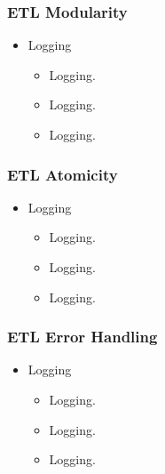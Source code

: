 
\begin{frame}
    \frametitle{ETL Modularity}
    \begin{itemize}[<+->]
        \item Logging
        \begin{itemize}[<+->]
            \item  Logging.
            \item  Logging.
            \item  Logging.


        \end{itemize}
    \end{itemize}
\end{frame}


\begin{frame}
    \frametitle{ETL Atomicity}
    \begin{itemize}[<+->]
        \item Logging
        \begin{itemize}[<+->]
            \item  Logging.
            \item  Logging.
            \item  Logging.


        \end{itemize}
    \end{itemize}
\end{frame}


\begin{frame}
    \frametitle{ETL Error Handling}
    \begin{itemize}[<+->]
        \item Logging
        \begin{itemize}[<+->]
            \item  Logging.
            \item  Logging.
            \item  Logging.


        \end{itemize}
    \end{itemize}
\end{frame}

